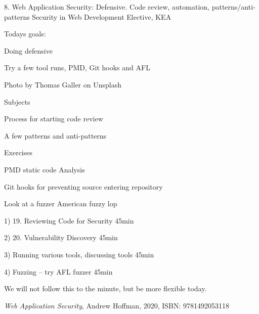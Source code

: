 \documentclass[Screen16to9,17pt]{foils}
\begin{document}
\mytitlepage
{8. Web Application Security: Defensive. Code review, automation, patterns/anti-patterns}
{Security in Web Development Elective, KEA}




Todays goals:
\begin{list2}
\item Doing defensive
\item Try a few tool runs, PMD, Git hooks and AFL
\end{list2}

Photo by Thomas Galler on Unsplash




\begin{list1}
\item Subjects
\begin{list2}
\item Process for starting code review
\item A few patterns and anti-patterns

\end{list2}
\item Exercises
\begin{list2}
\item PMD static code Analysis
\item Git hooks for preventing source entering repository
\item Look at a fuzzer American fuzzy lop
\end{list2}
\end{list1}


\begin{list2}
\item 1) 19. Reviewing Code for Security 45min
\item 2) 20. Vulnerability Discovery 45min
\item 3) Running various tools, discussing tools 45min
\item 4) Fuzzing -- try AFL fuzzer 45min
\end{list2}

We will not follow this to the minute, but be more flexible today.


\emph{Web Application Security}, Andrew Hoffman, 2020, ISBN: 9781492053118
\end{document}
